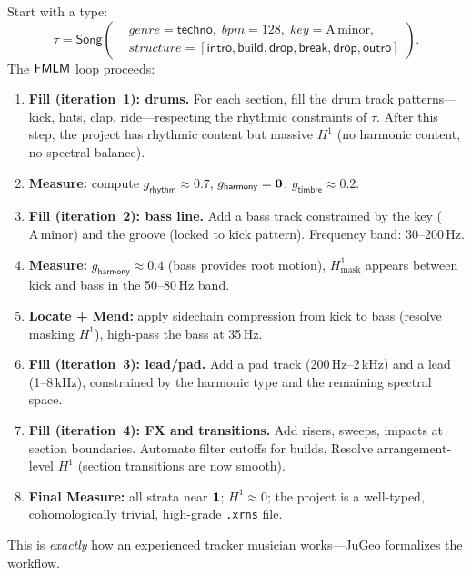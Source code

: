 \begin{example}
\label{ex:techno-gen}
Start with a type:
\[
  \tau = \mathsf{Song}\!\left(
    \begin{aligned}
      &\mathit{genre} = \mathsf{techno},\;
       \mathit{bpm} = 128,\;
       \mathit{key} = \mathrm{A}\,\text{minor}, \\
      &\mathit{structure} = [\mathsf{intro}, \mathsf{build},
        \mathsf{drop}, \mathsf{break}, \mathsf{drop},
        \mathsf{outro}]
    \end{aligned}
  \right).
\]
The $\mathsf{FMLM}$ loop proceeds:
\begin{enumerate}
  \item \textbf{Fill (iteration~1): drums.}\;
        For each section, fill the drum track patterns---kick,
        hats, clap, ride---respecting the rhythmic constraints
        of $\tau$.  After this step, the project has rhythmic
        content but massive $H^1$ (no harmonic content, no
        spectral balance).
  \item \textbf{Measure:}\;
        compute
        $g_{\mathsf{rhythm}} \approx 0.7$,
        $g_{\mathsf{harmony}} = \mathbf{0}$,
        $g_{\mathsf{timbre}} \approx 0.2$.
  \item \textbf{Fill (iteration~2): bass line.}\;
        Add a bass track constrained by the key
        ($\mathrm{A}\,\text{minor}$) and the groove (locked to
        kick pattern).  Frequency band: 30--200\,Hz.
  \item \textbf{Measure:}\;
        $g_{\mathsf{harmony}} \approx 0.4$ (bass provides root
        motion), $H^1_{\mathrm{mask}}$ appears between kick and
        bass in the 50--80\,Hz band.
  \item \textbf{Locate + Mend:}\;
        apply sidechain compression from kick to bass
        (resolve masking $H^1$), high-pass the bass at 35\,Hz.
  \item \textbf{Fill (iteration~3): lead/pad.}\;
        Add a pad track (200\,Hz--2\,kHz) and a lead
        (1--8\,kHz), constrained by the harmonic type and the
        remaining spectral space.
  \item \textbf{Fill (iteration~4): FX and transitions.}\;
        Add risers, sweeps, impacts at section boundaries.
        Automate filter cutoffs for builds.  Resolve
        arrangement-level $H^1$ (section transitions are now
        smooth).
  \item \textbf{Final Measure:}\;
        all strata near $\mathbf{1}$; $H^1 \approx 0$; the project
        is a well-typed, cohomologically trivial,
        high-grade \texttt{.xrns} file.
\end{enumerate}
This is \emph{exactly} how an experienced tracker musician
works---JuGeo formalizes the workflow.
\end{example}

